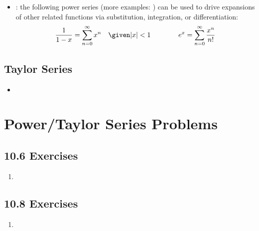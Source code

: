 \begin{itemize}
\begin{itemize}
      \item {}: the following power series
        (more examples: ) can be used to drive
        expansions of other related functions via substitution, integration, or
        differentiation:
        \[%
          \frac{1}{1-x} = \sum_{n=0}^{\infty} x^n \quad \given |x| < 1
          \qquad \qquad
          e^x = \sum_{n=0}^{\infty} \frac{x^n}{n!}
        \]%

    \end{itemize}
\end{itemize}

\newpage %

\subsection{Taylor Series}
\begin{itemize}
  \item

\end{itemize}

\section{Power/Taylor Series Problems}

\subsection{10.6 Exercises}
\begin{enumerate}[itemsep=3em]
  \item

\end{enumerate}

\subsection{10.8 Exercises}
\begin{enumerate}[itemsep=3em]
  \item
\end{enumerate}
